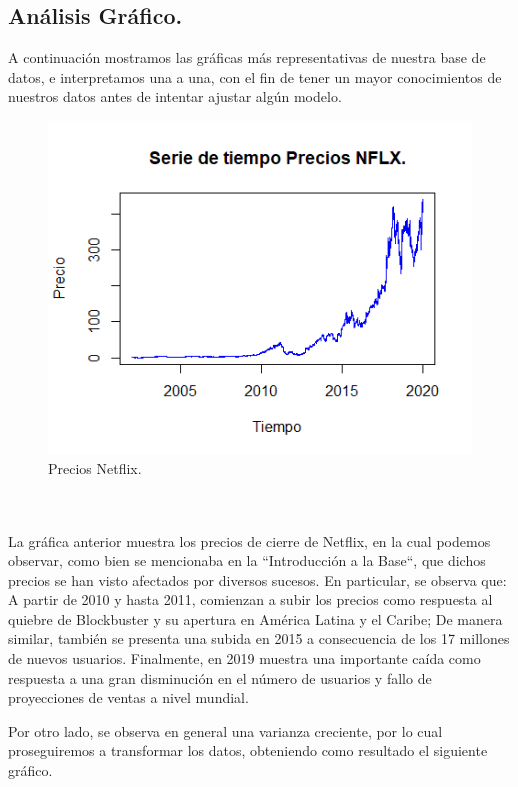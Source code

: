 \subsection{Análisis Gráfico.}
A continuación mostramos las gráficas más representativas de nuestra base de datos, e interpretamos una a una, con el fin de tener un mayor conocimientos de nuestros datos antes de intentar ajustar algún modelo.
\begin{figure}[!ht]
    \centering
    \includegraphics[scale=.75]{Graficos/PreciosNFLT.png}
   \caption{Precios Netflix.}
    \label{Precios Netflix.}
\end{figure}
\\\\

La gráfica anterior muestra los precios de cierre de Netflix, en la cual podemos observar, como bien se mencionaba en la ``Introducción a la Base``, que dichos precios se han visto afectados por diversos sucesos. En particular, se observa que: A partir de 2010 y hasta 2011, comienzan a subir los precios como respuesta al quiebre de Blockbuster y su apertura en América Latina y el Caribe; De manera similar, también se presenta una subida en 2015 a consecuencia de los 17 millones de nuevos usuarios. Finalmente, en 2019 muestra una importante caída como respuesta a una gran disminución en el número de usuarios y fallo de proyecciones de ventas a nivel mundial.   

Por otro lado, se observa en general una varianza creciente, por lo cual proseguiremos a transformar los datos, obteniendo como resultado el siguiente gráfico.

